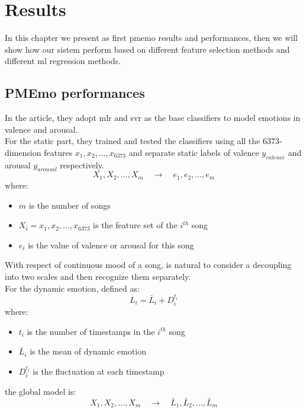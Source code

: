 \chapter{Results}
\label{chap:Improvements}
\pagestyle{plain}
\vspace{0.5cm}

\noindent In this chapter we present as first \gls{pmemo} results and performances, then we will show how our sistem perform based on different feature selection methods and different \gls{ml} regression methods.

\section{PMEmo performances}
In the article, they adopt \gls{mlr} and \gls{svr} as the base classifiers to model emotions in valence and arousal.
\\
For the static part, they trained and tested the classifiers using all the $6373$-dimension features $x_1,x_2,...,x_{6373}$ and separate static labels of valence $y_{valence}$ and arousal $y_{arousal}$ respectively.
\begin{equation}
	{X_1,X_2,...,X_m} \quad \rightarrow \quad {e_1,e_2,...,e_m}
\end{equation}
where:
\begin{itemize}
	\item $m$ is the number of songs
	\item $X_i={x_1,x_2,...,x_{6373}}$ is the feature set of the $i^{th}$ song
	\item $e_i$ is the value of valence or arousal for this song
\end{itemize}
With respect of continuous mood of a song, is natural to consider a decoupling into two scales and then recognize them separately.
\\
For the dynamic emotion, defined as:
\begin{equation}
	L_i=\bar{L}_i+D_i^{t_i}
\end{equation}
where:
\begin{itemize}
	\item $t_i$ is the number of timestamps in the $i^{th}$ song
	\item $\bar{L}_i$ is the mean of dynamic emotion
	\item $D_i^{t_i}$ is the fluctuation at each timestamp
\end{itemize}
the global model is:
\begin{equation}
	{X_1,X_2,...,X_m} \quad \rightarrow \quad {\bar{L}_1,\bar{L}_2,...,\bar{L}_m}
\end{equation}
